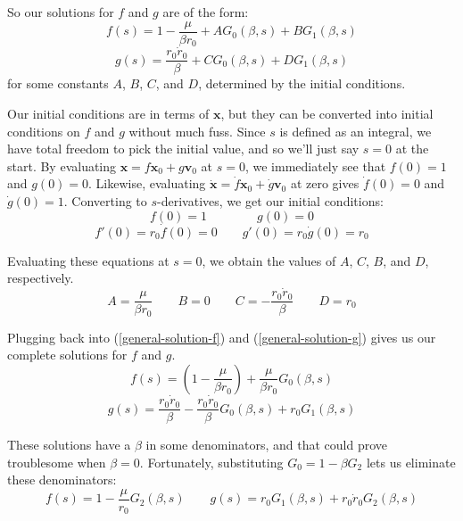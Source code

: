 \documentclass{article}
\numberwithin{equation}{subsection}
\begin{document}
So our solutions for $f$ and $g$ are of the form:
\begin{equation}
\label{general-solution-f}
f(s) = 1 - \frac{\mu}{\beta r_0} + A G_0(\beta, s) + B G_1(\beta, s)
\end{equation}
\begin{equation}
\label{general-solution-g}
g(s) = \frac{r_0 \dot{r}_0}{\beta} + C G_0(\beta, s) + D G_1(\beta, s)
\end{equation}
for some constants $A$, $B$, $C$, and $D$, determined by the initial conditions.

Our initial conditions are in terms of $\bm x$, but they can be converted into initial conditions on $f$ and $g$ without much fuss. Since $s$ is defined as an integral, we have total freedom to pick the initial value, and so we'll just say $s = 0$ at the start. By evaluating $\bm x = f \bm x_0 + g \bm v_0$ at $s = 0$, we immediately see that $f(0) = 1$ and $g(0) = 0$. Likewise, evaluating $\dot{\bm x} = \dot{f} \bm x_0 + \dot{g} \bm v_0$ at zero gives $\dot f(0) = 0$ and $\dot g(0) = 1$. Converting to $s$-derivatives, we get our initial conditions:
\begin{equation}
f(0) = 1 \qquad\qquad g(0) = 0
\end{equation}
\begin{equation*}
f'(0) = r_0 \dot{f}(0) = 0 \qquad g'(0) = r_0 \dot{g}(0) = r_0
\end{equation*}

Evaluating these equations at $s = 0$, we obtain the values of $A$, $C$, $B$, and $D$, respectively.
\begin{equation}
A = \frac{\mu}{\beta r_0} \qquad B = 0 \qquad C = -\frac{r_0 \dot{r}_0}{\beta} \qquad D = r_0
\end{equation}

Plugging back into (\ref{general-solution-f}) and (\ref{general-solution-g}) gives us our complete solutions for $f$ and $g$.
\begin{equation}
f(s) = \left( 1 - \frac{\mu}{\beta r_0} \right) + \frac{\mu}{\beta r_0} G_0(\beta, s)
\end{equation}
\begin{equation}
g(s) = \frac{r_0 \dot{r}_0}{\beta} - \frac{r_0 \dot{r}_0}{\beta} G_0(\beta, s) + r_0 G_1(\beta, s)
\end{equation}

These solutions have a $\beta$ in some denominators, and that could prove troublesome when $\beta = 0$.
Fortunately, substituting $G_0 = 1 - \beta G_2$ lets us eliminate these denominators:
\begin{equation}
\label{solution-for-position}
f(s) = 1 - \frac{\mu}{r_0} G_2(\beta, s)
\qquad
g(s) = r_0 G_1(\beta, s) + r_0 \dot{r}_0 G_2(\beta, s)
\end{equation}
\end{document}
